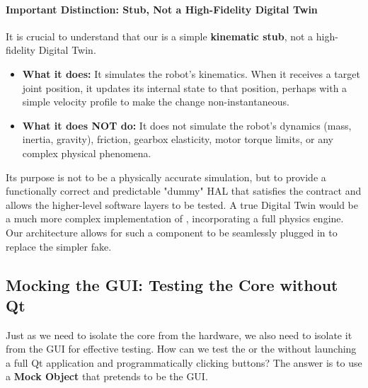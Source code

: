 \paragraph{Important Distinction: Stub, Not a High-Fidelity Digital Twin}
It is crucial to understand that our  is a simple \textbf{kinematic stub}, not a high-fidelity Digital Twin.
\begin{itemize}
    \item \textbf{What it does:} It simulates the robot's kinematics. When it receives a target joint position, it updates its internal state to that position, perhaps with a simple velocity profile to make the change non-instantaneous.
    \item \textbf{What it does NOT do:} It does not simulate the robot's dynamics (mass, inertia, gravity), friction, gearbox elasticity, motor torque limits, or any complex physical phenomena.
\end{itemize}
Its purpose is not to be a physically accurate simulation, but to provide a functionally correct and predictable "dummy" HAL that satisfies the  contract and allows the higher-level software layers to be tested. A true Digital Twin would be a much more complex implementation of , incorporating a full physics engine. Our architecture allows for such a component to be seamlessly plugged in to replace the simpler fake.

\subsection{Mocking the GUI: Testing the Core without Qt}
\label{subsec:mocking_the_gui}

Just as we need to isolate the core from the hardware, we also need to isolate it from the GUI for effective testing. How can we test the  or the  without launching a full Qt application and programmatically clicking buttons? The answer is to use a \textbf{Mock Object} that pretends to be the GUI.


